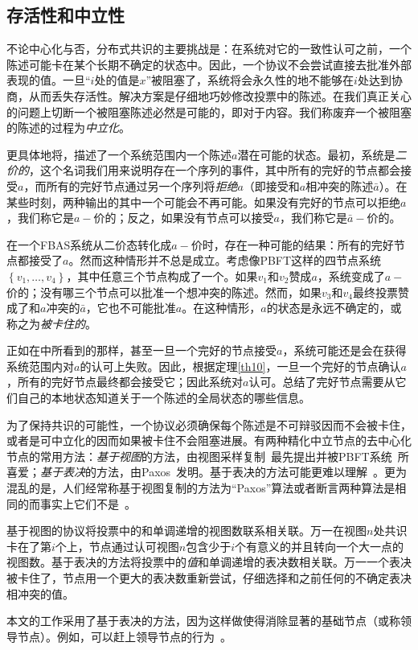 \subsection{存活性和中立性}\label{sec:vote_stuck}

不论中心化与否，分布式共识的主要挑战是：在系统对它的一致性认可之前，一个陈述可能卡在某个长期不确定的状态中。因此，一个协议不会尝试直接去批准外部表现的值。一旦``{\slot}$i$处的值是$x$''被阻塞了，系统将会永久性的地不能够在{\slot}$i$处达到协商，从而丢失存活性。解决方案是仔细地巧妙修改投票中的陈述。在我们真正关心的问题上切断一个被阻塞陈述必然是可能的，即对于{\slot}内容。我们称废弃一个被阻塞的陈述的过程为\textit{中立化}。

更具体地将，描述了一个系统范围内一个陈述$a$潜在可能的状态。最初，系统是\textit{二价的}，这个名词我们用来说明存在一个序列的事件，其中所有的完好的节点都会接受$a$，而所有的完好节点通过另一个序列将\textit{拒绝}$a$（即接受和$a$相冲突的陈述$\bar a$）。在某些时刻，两种输出的其中一个可能会不再可能。如果没有完好的节点可以拒绝$a$，我们称它是$a-$价的；反之，如果没有节点可以接受$a$，我们称它是$\bar a-$价的。

在一个FBAS系统从二价态转化成$a-\!\!$价时，存在一种可能的结果：所有的完好节点都接受了$a$。然而这种情形并不总是成立。考虑像PBFT这样的四节点系统$\left\{v_1,\ldots,v_4\right\}$，其中任意三个节点构成了一个{\quorum}。如果$v_1$和$v_2$赞成$a$，系统变成了$a-\!\!$价的；没有哪三个节点可以批准一个想冲突的陈述。然而，如果$v_3$和$v_4$最终投票赞成了和$a$冲突的$\bar a$，它也不可能批准$a$。在这种情形，$a$的状态是永远不确定的，或称之为\textit{被卡住的}。

正如在中所看到的那样，甚至一旦一个完好的节点接受$a$，系统可能还是会在获得系统范围内对$a$的认可上失败。因此，根据定理\ref{th10}，一旦一个完好的节点确认$a$，所有的完好节点最终都会接受它；因此系统对$a$认可。总结了完好节点需要从它们自己的本地状态知道关于一个陈述的全局状态的哪些信息。

为了保持共识的可能性，一个协议必须确保每个陈述是不可辩驳因而不会被卡住，或者是可中立化的因而如果被卡住不会阻塞进展。有两种精化中立节点的去中心化节点的常用方法：\textit{基于视图}的方法，由视图采样复制~\cite{Oki:1988:VRN:62546.62549}最先提出并被PBFT系统~\cite{Castro:1999:PBFT}所喜爱；\textit{基于表决}的方法，由Paxos~\cite{Lamport:1998:PP:279227.279229}发明。基于表决的方法可能更难以理解~\cite{Ongaro:2014:SUC:2643634.2643666}。更为混乱的是，人们经常称基于视图复制的方法为``Paxos''算法或者断言两种算法是相同的而事实上它们不是~\cite{6894199}。

基于视图的协议将投票中的{\slot}和单调递增的视图数联系相关联。万一在视图$n$处共识卡在了第$i$个{\slot}上，节点通过认可视图$n$包含少于$i$个有意义的{\slot}并且转向一个大一点的视图数。基于表决的方法将投票中的\textit{值}和单调递增的表决数相关联。万一一个表决被卡住了，节点用一个更大的表决数重新尝试，仔细选择和之前任何的不确定表决相冲突的值。

本文的工作采用了基于表决的方法，因为这样做使得消除显著的基础节点（或称领导节点）。例如，可以赶上领导节点的行为~\cite{Lamport:2011:BPR:2075029.2075058}。
